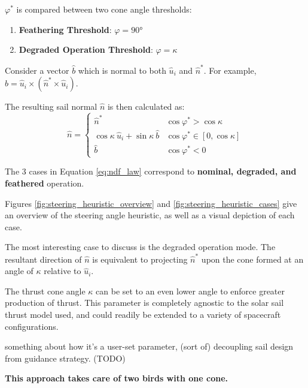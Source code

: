 \(\varphi^*\) is compared between two cone angle thresholds:
\begin{enumerate}
  \item \textbf{Feathering Threshold}: \(\varphi = \ang{90}\)
  \item \textbf{Degraded Operation Threshold}: \(\varphi = \kappa\)
\end{enumerate}

Consider a vector \(\hat{b}\) which is normal to both \(\hat{u}_i\) and \(\hat{n}^*\). For example, \(\hat{b} = \hat{u}_i \times (\hat{n}^* \times \hat{u}_i)\).

The resulting sail normal \(\hat{n}\) is then calculated as:
\begin{equation}
  \hat{n} = \begin{cases}
    \hat{n}^*                                       & \cos \varphi^* > \cos \kappa          \\
    \cos \kappa \ \hat{u}_i + \sin \kappa \ \hat{b} & \cos \varphi^* \in  [ 0, \cos \kappa] \\
    \hat{b}                                         & \cos \varphi^* < 0
  \end{cases}
  \label{eq:ndf_law}
\end{equation}

The 3 cases in Equation \ref{eq:ndf_law} correspond to \textbf{nominal, degraded, and feathered} operation.




Figures \ref{fig:steering_heuristic_overview} and \ref{fig:steering_heuristic_cases} give an overview of the steering angle heuristic, as well as a visual depiction of each case.

The most interesting case to discuss is the degraded operation mode. The resultant direction of \(\hat{n}\) is equivalent to projecting \(\hat{n}^*\) upon the cone formed at an angle of \(\kappa\) relative to \(\hat{u}_i\).

The thrust cone angle \(\kappa\) can be set to an even lower angle to enforce greater production of thrust. This parameter is completely agnostic to the solar sail thrust model used, and could readily be extended to a variety of spacecraft configurations.

something about how it's a user-set parameter, (sort of) decoupling sail design from guidance strategy. (TODO)

\textbf{This approach takes care of two birds with one cone.}

